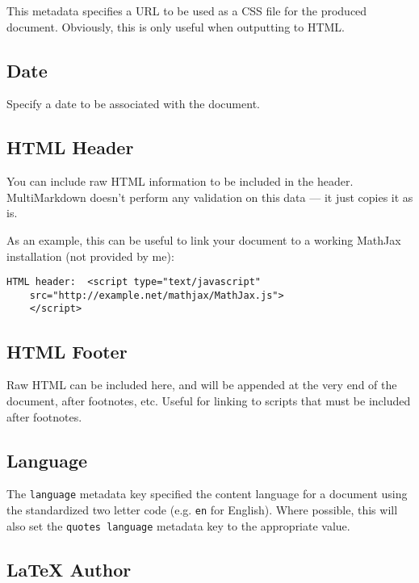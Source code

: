 This metadata specifies a URL to be used as a CSS file for the produced
document. Obviously, this is only useful when outputting to HTML.

\subsection{Date }
\label{date}

Specify a date to be associated with the document.

\subsection{HTML Header }
\label{htmlheader}

You can include raw HTML information to be included in the header.
MultiMarkdown doesn't perform any validation on this data --- it just copies
it as is.

As an example, this can be useful to link your document to a working MathJax
installation (not provided by me):

\begin{verbatim}
HTML header:  <script type="text/javascript"
	src="http://example.net/mathjax/MathJax.js">
	</script>
\end{verbatim}

\subsection{HTML Footer }
\label{htmlfooter}

Raw HTML can be included here, and will be appended at the very end of the
document, after footnotes, etc. Useful for linking to scripts that must
be included after footnotes.

\subsection{Language }
\label{language}

The \texttt{language} metadata key specified the content language for a document using the standardized two letter code (e.g. \texttt{en} for English). Where possible, this will also set the \texttt{quotes language} metadata key to the appropriate value.

\subsection{LaTeX Author }
\label{latexauthor}


